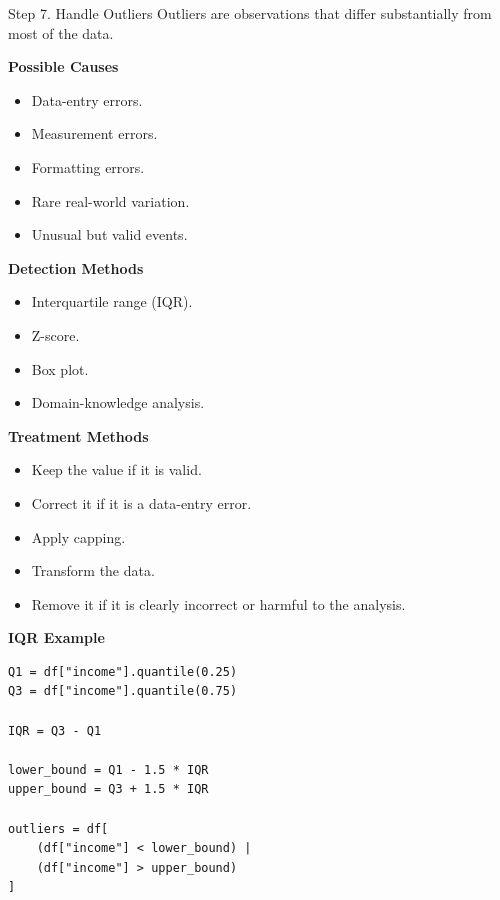 \documentclass[aspectratio=169,11pt]{beamer}
\begin{document}
\begin{frame}{Step 7. Handle Outliers}
\footnotesize
Outliers are observations that differ substantially from most of the data.\par\medskip
\textbf{Possible Causes}\par\medskip
\begin{itemize}
\item Data-entry errors.
\item Measurement errors.
\item Formatting errors.
\item Rare real-world variation.
\item Unusual but valid events.
\end{itemize}
\textbf{Detection Methods}\par\medskip
\begin{itemize}
\item Interquartile range (IQR).
\item Z-score.
\item Box plot.
\item Domain-knowledge analysis.
\end{itemize}
\textbf{Treatment Methods}\par\medskip
\begin{itemize}
\item Keep the value if it is valid.
\item Correct it if it is a data-entry error.
\item Apply capping.
\item Transform the data.
\item Remove it if it is clearly incorrect or harmful to the analysis.
\end{itemize}
\textbf{IQR Example}\par\medskip
\begin{lstlisting}[style=py]
Q1 = df["income"].quantile(0.25)
Q3 = df["income"].quantile(0.75)

IQR = Q3 - Q1

lower_bound = Q1 - 1.5 * IQR
upper_bound = Q3 + 1.5 * IQR

outliers = df[
    (df["income"] < lower_bound) |
    (df["income"] > upper_bound)
]
\end{lstlisting}
\end{frame}
\end{document}
